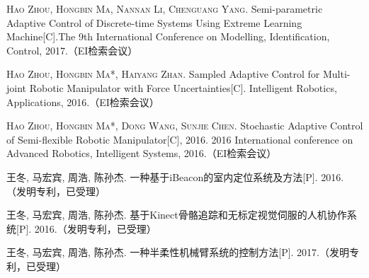 
\begin{publications}{99}
    \item\textsc{Hao Zhou, Hongbin Ma, Nannan Li, Chenguang Yang}. {Semi-parametric Adaptive Control of Discrete-time Systems Using Extreme Learning Machine}[C].The 9th International Conference on Modelling, Identification, Control, 2017.（EI检索会议）
    \item\textsc{Hao Zhou, Hongbin Ma*, Haiyang Zhan}. {Sampled Adaptive Control for Multi-joint Robotic Manipulator with Force Uncertainties}[C]. Intelligent Robotics, Applications, 2016.（EI检索会议）
    \item\textsc{Hao Zhou, Hongbin Ma*, Dong Wang, Sunjie Chen}. {Stochastic Adaptive Control of Semi-flexible Robotic Manipulator}[C], 2016. 2016 International conference on Advanced Robotics, Intelligent Systems, 2016.（EI检索会议）
    \item\textsc{王冬, 马宏宾, 周浩, 陈孙杰}. {一种基于iBeacon的室内定位系统及方法}[P]. 2016.（发明专利，已受理）
    \item\textsc{王冬, 马宏宾, 周浩, 陈孙杰}. {基于Kinect骨骼追踪和无标定视觉伺服的人机协作系统}[P]. 2016.（发明专利，已受理）
    \item\textsc{王冬, 马宏宾, 周浩, 陈孙杰}. {一种半柔性机械臂系统的控制方法}[P]. 2017.（发明专利，已受理）
\end{publications}
